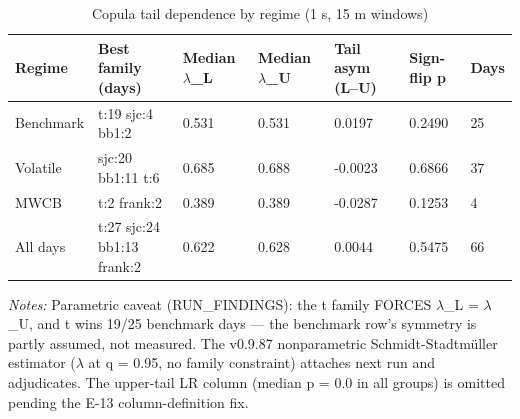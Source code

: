 \begin{table}[htbp]\centering
\caption{Copula tail dependence by regime (1 s, 15 m windows)}
\label{tab:t11a}
\small
\begin{tabular}{lllllll}
\toprule
Regime & Best family (days) & Median $\lambda$\_L & Median $\lambda$\_U & Tail asym (L--U) & Sign-flip p & Days \\
\midrule
Benchmark & t:19 sjc:4 bb1:2 & 0.531 & 0.531 & 0.0197 & 0.2490 & 25 \\
Volatile & sjc:20 bb1:11 t:6 & 0.685 & 0.688 & -0.0023 & 0.6866 & 37 \\
MWCB & t:2 frank:2 & 0.389 & 0.389 & -0.0287 & 0.1253 & 4 \\
All days & t:27 sjc:24 bb1:13 frank:2 & 0.622 & 0.628 & 0.0044 & 0.5475 & 66 \\
\bottomrule
\end{tabular}
\begin{minipage}{\linewidth}\vspace{2pt}\footnotesize\emph{Notes:} Parametric caveat (RUN\_FINDINGS): the t family FORCES $\lambda$\_L = $\lambda$\_U, and t wins 19/25 benchmark days — the benchmark row's symmetry is partly assumed, not measured. The v0.9.87 nonparametric Schmidt-Stadtmüller estimator ($\lambda$ at q = 0.95, no family constraint) attaches next run and adjudicates. The upper-tail LR column (median p = 0.0 in all groups) is omitted pending the E-13 column-definition fix.\end{minipage}
\end{table}
